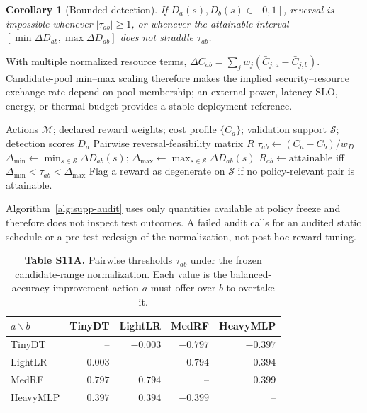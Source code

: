 \documentclass[10pt,a4paper]{article}
\newtheorem{corollary}[theorem]{Corollary}
\begin{document}
\begin{corollary}[Bounded detection]
If $D_a(s),D_b(s)\in[0,1]$, reversal is impossible whenever $|\tau_{ab}|\ge 1$, or whenever the attainable interval $[\min\Delta D_{ab},\max\Delta D_{ab}]$ does not straddle $\tau_{ab}$.
\end{corollary}

With multiple normalized resource terms, $\Delta C_{ab}=\sum_j w_j(\bar C_{j,a}-\bar C_{j,b})$. Candidate-pool min--max scaling therefore makes the implied security--resource exchange rate depend on pool membership; an external power, latency-SLO, energy, or thermal budget provides a stable deployment reference.

\begin{algorithm}[h!]
\caption{Validation-only reward audit}\label{alg:supp-audit}
\footnotesize
\begin{algorithmic}[1]
\REQUIRE Actions $\mathcal M$; declared reward weights; cost profile $\{C_a\}$; validation support $\mathcal S$; detection scores $D_a$
\ENSURE Pairwise reversal-feasibility matrix $R$
  \STATE $\tau_{ab}\leftarrow(C_a-C_b)/w_D$
  \STATE $\Delta_{\min}\leftarrow\min_{s\in\mathcal S}\Delta D_{ab}(s)$; $\Delta_{\max}\leftarrow\max_{s\in\mathcal S}\Delta D_{ab}(s)$
  \STATE $R_{ab}\leftarrow\text{attainable}$ iff $\Delta_{\min}<\tau_{ab}<\Delta_{\max}$
\ENDFOR
\STATE Flag a reward as degenerate on $\mathcal S$ if no policy-relevant pair is attainable.
\end{algorithmic}
\end{algorithm}

Algorithm~\ref{alg:supp-audit} uses only quantities available at policy freeze and therefore does not inspect test outcomes. A failed audit calls for an audited static schedule or a pre-test redesign of the normalization, not post-hoc reward tuning.

\begin{table}[h!]
\centering\small
\caption*{\textbf{Table S11A.} Pairwise thresholds $\tau_{ab}$ under the frozen candidate-range normalization. Each value is the balanced-accuracy improvement action $a$ must offer over $b$ to overtake it.}
\setlength{\tabcolsep}{6pt}
\begin{tabular}{lrrrr}\toprule
$a\backslash b$ & TinyDT & LightLR & MedRF & HeavyMLP\\\midrule
TinyDT     & --       & $-0.003$ & $-0.797$ & $-0.397$\\
LightLR    & $0.003$  & --       & $-0.794$ & $-0.394$\\
MedRF      & $0.797$  & $0.794$  & --       & $0.399$\\
HeavyMLP   & $0.397$  & $0.394$  & $-0.399$ & --\\
\bottomrule\end{tabular}
\end{table}
\end{document}
